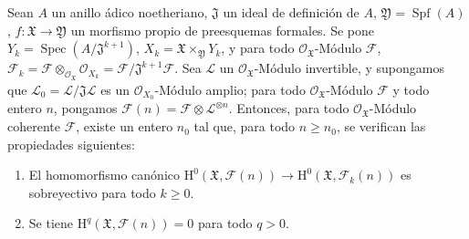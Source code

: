 \begin{proposition}[5.2.3]
\label{III.5.2.3-fr}
Sean $A$ un anillo ádico noetheriano, $\mathfrak J$ un ideal de definición de
$A$, $\mathfrak Y=\operatorname{Spf}(A)$,
$f:\mathfrak X\to\mathfrak Y$ un morfismo propio de preesquemas formales. Se pone
$Y_k=\operatorname{Spec}(A/\mathfrak J^{k+1})$,
$X_k=\mathfrak X\times_{\mathfrak Y}Y_k$, y para todo
$\mathcal O_{\mathfrak X}$-Módulo $\mathcal F$,
$\mathcal F_k=\mathcal F\otimes_{\mathcal O_{\mathfrak X}}\mathcal O_{X_k}
=\mathcal F/\mathfrak J^{k+1}\mathcal F$.
Sea $\mathcal L$ un $\mathcal O_{\mathfrak X}$-Módulo invertible, y supongamos que
$\mathcal L_0=\mathcal L/\mathfrak J\mathcal L$ es un
$\mathcal O_{X_0}$-Módulo amplio; para todo $\mathcal O_{\mathfrak X}$-Módulo
$\mathcal F$ y todo entero $n$, pongamos
$\mathcal F(n)=\mathcal F\otimes\mathcal L^{\otimes n}$. Entonces, para todo
$\mathcal O_{\mathfrak X}$-Módulo coherente $\mathcal F$, existe un entero $n_0$
tal que, para todo $n\geq n_0$, se verifican las propiedades siguientes:
\begin{enumerate}
\item[\textup{(i)}] El homomorfismo canónico
$\mathrm H^0(\mathfrak X,\mathcal F(n))\to
\mathrm H^0(\mathfrak X,\mathcal F_k(n))$ es sobreyectivo para todo $k\geq0$.
\item[\textup{(ii)}] Se tiene $\mathrm H^q(\mathfrak X,\mathcal F(n))=0$ para todo $q>0$.
\end{enumerate}
\end{proposition}

